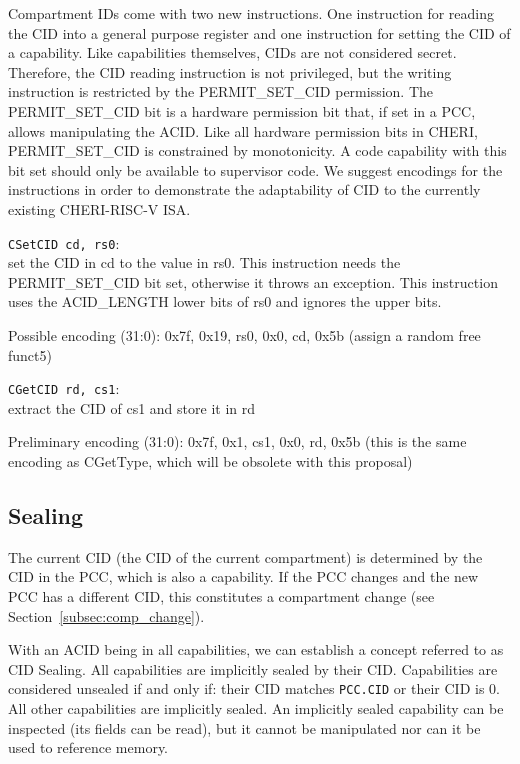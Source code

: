 Compartment IDs come with two new instructions.
One instruction for reading the CID into a general purpose register and one instruction for setting the CID of a capability.
Like capabilities themselves, CIDs are not considered secret.
Therefore, the CID reading instruction is not privileged, but the writing instruction is restricted by the PERMIT\_SET\_CID permission.
The PERMIT\_SET\_CID bit is a hardware permission bit that, if set in a PCC, allows manipulating the ACID.
Like all hardware permission bits in CHERI, PERMIT\_SET\_CID is constrained by monotonicity.
A code capability with this bit set should only be available to supervisor code.
We suggest encodings for the instructions in order to demonstrate the adaptability of CID to the currently existing CHERI-RISC-V ISA.

\texttt{CSetCID cd, rs0}:\\
set the CID in cd to the value in rs0.
This instruction needs the PERMIT\_SET\_CID bit set, otherwise it throws an exception.
This instruction uses the ACID\_LENGTH lower bits of rs0 and ignores the upper bits.

Possible encoding (31:0): 0x7f, 0x19, rs0, 0x0, cd, 0x5b (assign a random free funct5)

\texttt{CGetCID rd, cs1}:\\
extract the CID of cs1 and store it in rd

Preliminary encoding (31:0): 0x7f, 0x1, cs1, 0x0, rd, 0x5b (this is the same encoding as CGetType, which will be obsolete with this proposal)

\subsection{Sealing}

The current CID (the CID of the current compartment) is determined by the CID in the PCC, which is also a capability.
If the PCC changes and the new PCC has a different CID, this constitutes a compartment change (see Section~\ref{subsec:comp_change}).

With an ACID being in all capabilities, we can establish a concept referred to as CID Sealing.
All capabilities are implicitly sealed by their CID.
Capabilities are considered unsealed if and only if: their CID matches \texttt{PCC.CID} or their CID is 0. All other capabilities are implicitly sealed.
An implicitly sealed capability can be inspected (its fields can be read), but it cannot be manipulated nor can it be used to reference memory.

